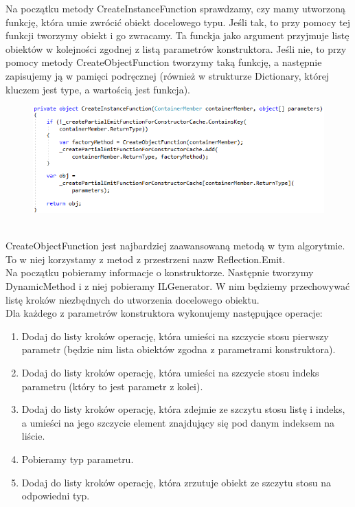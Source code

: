 \documentclass[12pt]{article}
\begin{document}
Na początku metody CreateInstanceFunction sprawdzamy, czy mamy utworzoną funkcję, która umie zwrócić obiekt docelowego typu. Jeśli tak, to przy pomocy tej funkcji tworzymy obiekt  i go zwracamy. Ta funckja jako argument przyjmuje listę obiektów w kolejności zgodnej z listą parametrów konstruktora. Jeśli nie, to przy pomocy metody CreateObjectFunction tworzymy taką funkcję, a następnie zapisujemy ją w pamięci podręcznej (również w strukturze Dictionary, której kluczem jest type, a wartością jest funkcja).
\begin{figure}[h]
	\begin{raggedleft}
  		\includegraphics{PartialEmitFunction_CreateInstanceFunction.png}
	\end{raggedleft}
\end{figure}\\
CreateObjectFunction jest najbardziej zaawansowaną metodą w tym algorytmie. To w niej korzystamy z metod z przestrzeni nazw Reflection.Emit.\\
Na początku pobieramy informacje o konstruktorze. Następnie tworzymy DynamicMethod i z niej pobieramy ILGenerator. W nim będziemy przechowywać listę kroków niezbędnych do utworzenia docelowego obiektu.\\
Dla każdego z parametrów konstruktora wykonujemy następujące operacje:
\begin{enumerate}
	\item Dodaj do listy kroków operację, która umieści na szczycie stosu pierwszy parametr (będzie nim lista obiektów zgodna z parametrami konstruktora).
	\item Dodaj do listy kroków operację, która umieści na szczycie stosu indeks parametru (który to jest parametr z kolei).
	\item Dodaj do listy kroków operację, która zdejmie ze szczytu stosu listę i indeks, a umieści na jego szczycie element znajdujący się pod danym indeksem na liście.
	\item Pobieramy typ parametru.
	\item Dodaj do listy kroków operację, która zrzutuje obiekt ze szczytu stosu na odpowiedni typ.
\end{enumerate}
\end{document}
